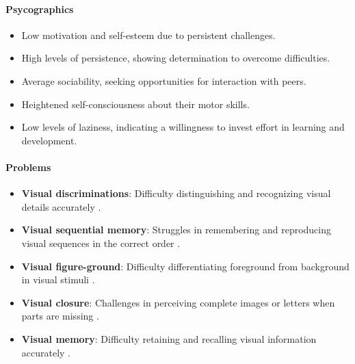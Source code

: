 \paragraph{Psycographics}
\begin{itemize}
    \item Low motivation and self-esteem due to persistent challenges.
    \item High levels of persistence, showing determination to overcome difficulties.
    \item Average sociability, seeking opportunities for interaction with peers.
    \item Heightened self-consciousness about their motor skills.
    \item Low levels of laziness, indicating a willingness to invest effort in learning and development.
\end{itemize}

\paragraph{Problems}
\begin{itemize}
    \item \textbf{Visual discriminations}: Difficulty distinguishing and recognizing visual details accurately \cite{Speechify}.
    \item \textbf{Visual sequential memory}: Struggles in remembering and reproducing visual sequences in the correct order \cite{Speechify}.
    \item \textbf{Visual figure-ground}: Difficulty differentiating foreground from background in visual stimuli \cite{Speechify}.
    \item \textbf{Visual closure}: Challenges in perceiving complete images or letters when parts are missing \cite{Speechify}.
    \item \textbf{Visual memory}: Difficulty retaining and recalling visual information accurately \cite{Speechify}.
\end{itemize}

